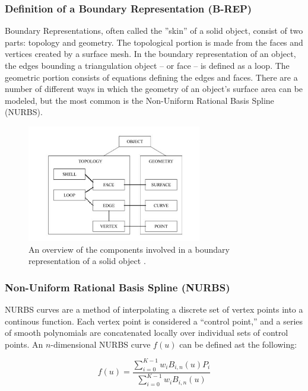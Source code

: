 \documentclass[12pt]{drexelthesis}
\let\Oldsubsubsection\subsubsection
\renewcommand{\subsubsection}{\FloatBarrier\Oldsubsubsection}
\begin{document}
\subsubsection{Definition of a Boundary Representation (B-REP)}
Boundary Representations, often called the ''skin'' of a solid object, consist of two parts: topology and geometry. The topological portion is made from the faces and vertices created by a surface mesh. In the boundary representation of an object, the edges bounding a triangulation object -- or face -- is defined as a loop. The geometric portion consists of equations defining the edges and faces. There are a number of different ways in which the geometry of an object's surface area can be modeled, but the most common is the Non-Uniform Rational Basis Spline (NURBS).

\begin{figure}[!ht]
	\centering
		\includegraphics[width=3in]{cadTypes/brep.jpg}
	\caption[Components of a boundary representation.]{\centering An overview of the components involved in a boundary representation of a solid object \cite{Stroud2006}.}
\end{figure}

\subsubsection{Non-Uniform Rational Basis Spline (NURBS)}
NURBS curves are a method of interpolating a discrete set of vertex points into a continous function. Each vertex point is considered a ``control point,'' and a series of smooth polynomials are concatenated locally over individual sets of control points. An $n$-dimensional NURBS curve $f(u)$ can be defined ast the following:

\begin{equation}
	f(u) = \frac    {   \sum_{i=0}^{K-1} w_{i} B_{i,n}(u) P_{i} }
				 	{  \sum_{i=0}^{K-1} w_{i} B_{i,n}(u) }
	\label{nurbs:weightedbspline}
 \end{equation}
 
\end{document}
